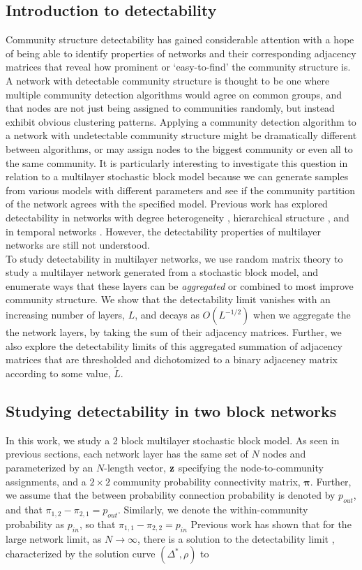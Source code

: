\subsection{Introduction to detectability}
Community structure detectability has gained considerable attention \cite{detect20,detect21,detect22,detect23,detect24,detect25} with a hope of being able to identify properties of networks and their corresponding adjacency matrices that reveal how prominent or `easy-to-find' the community structure is. A network with detectable community structure is thought to be one where multiple community detection algorithms would agree on common groups, and that nodes are not just being assigned to communities randomly, but instead exhibit obvious clustering patterns. Applying a community detection algorithm to a network with undetectable community structure might be dramatically different between algorithms, or may assign nodes to the biggest community or even all to the same community. It is particularly interesting to investigate this question in relation to a multilayer stochastic block model because we can generate samples from various models with different parameters and see if the community partition of the network agrees with the specified model. Previous work has explored detectability in networks with degree heterogeneity \cite{detectDegreeHetero}, hierarchical structure \cite{peixotoHierarchAttribute,HierarchAttl}, and in temporal networks \cite{detectTemporal}.  However, the detectability properties of multilayer networks are still not understood. \\
\indent To study detectability in multilayer networks, we use random matrix theory to study a multilayer network generated from a stochastic block model, and enumerate ways that these layers can be \emph{aggregated} or combined to most improve community structure. We show that the detectability limit vanishes with an increasing number of layers, $L$, and decays as $O(L^{-1/2})$ when we aggregate the the network layers, by taking the sum of their adjacency matrices. Further, we also explore the detectability limits of this aggregated summation of adjacency matrices  that are thresholded and dichotomized to a binary adjacency matrix according to some value, $\tilde{L}$.  

\subsection{Studying detectability in two block networks}
In this work, we study a 2 block multilayer stochastic block model. As seen in previous sections, each network layer has the same set of $N$ nodes and parameterized by an $N$-length vector, ${\bf z}$ specifying the node-to-community assignments, and a $2 \times 2$ community probability connectivity matrix, ${\boldsymbol \pi}$. Further, we assume that the between probability connection probability is denoted by $p_{out}$, and that $\pi_{1,2}-\pi_{2,1}=p_{out}$. Similarly, we denote the within-community probability as $p_{in}$, so that $\pi_{1,1}-\pi_{2,2}=p_{in}$ Previous work has shown that for the large network limit, as $N \rightarrow \infty$, there is a solution to the detectability limit \cite{detect23,detect24}, characterized by the solution curve $(\Delta^{*},\rho)$ to 

